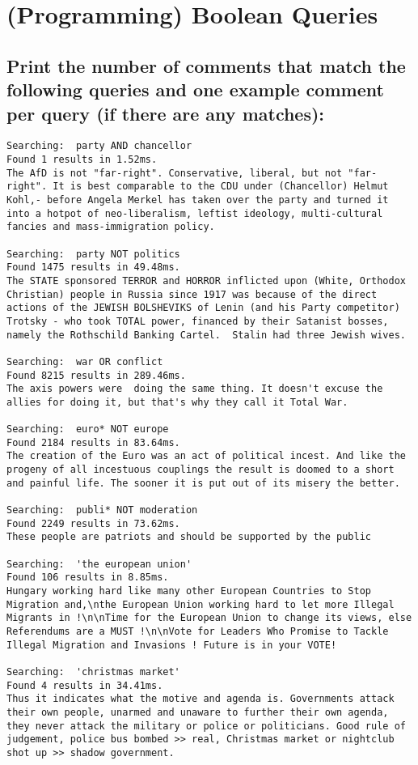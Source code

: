 \documentclass{scrartcl}
\begin{document}
\section{(Programming) Boolean Queries
}

\subsection{Print the number of comments that match the following queries and one example comment
	per query (if there are any matches):}

\begin{lstlisting}
Searching:  party AND chancellor
Found 1 results in 1.52ms.
The AfD is not "far-right". Conservative, liberal, but not "far-right". It is best comparable to the CDU under (Chancellor) Helmut Kohl,- before Angela Merkel has taken over the party and turned it into a hotpot of neo-liberalism, leftist ideology, multi-cultural fancies and mass-immigration policy.

Searching:  party NOT politics
Found 1475 results in 49.48ms.
The STATE sponsored TERROR and HORROR inflicted upon (White, Orthodox Christian) people in Russia since 1917 was because of the direct actions of the JEWISH BOLSHEVIKS of Lenin (and his Party competitor) Trotsky - who took TOTAL power, financed by their Satanist bosses, namely the Rothschild Banking Cartel.  Stalin had three Jewish wives.

Searching:  war OR conflict
Found 8215 results in 289.46ms.
The axis powers were  doing the same thing. It doesn't excuse the allies for doing it, but that's why they call it Total War.

Searching:  euro* NOT europe
Found 2184 results in 83.64ms.
The creation of the Euro was an act of political incest. And like the progeny of all incestuous couplings the result is doomed to a short and painful life. The sooner it is put out of its misery the better.

Searching:  publi* NOT moderation
Found 2249 results in 73.62ms.
These people are patriots and should be supported by the public

Searching:  'the european union'
Found 106 results in 8.85ms.
Hungary working hard like many other European Countries to Stop Migration and,\nthe European Union working hard to let more Illegal Migrants in !\n\nTime for the European Union to change its views, else Referendums are a MUST !\n\nVote for Leaders Who Promise to Tackle Illegal Migration and Invasions ! Future is in your VOTE!

Searching:  'christmas market'
Found 4 results in 34.41ms.
Thus it indicates what the motive and agenda is. Governments attack their own people, unarmed and unaware to further their own agenda, they never attack the military or police or politicians. Good rule of judgement, police bus bombed >> real, Christmas market or nightclub shot up >> shadow government.

\end{lstlisting}
\end{document}
